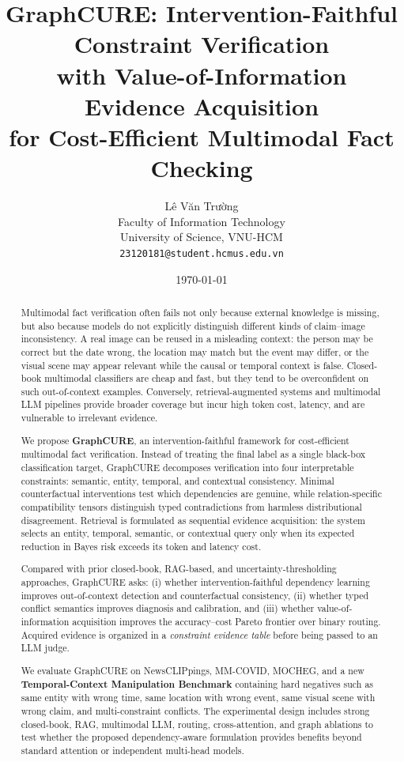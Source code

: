 \documentclass[11pt,a4paper]{article}
\title{
\textbf{GraphCURE: Intervention-Faithful Constraint Verification\\
with Value-of-Information Evidence Acquisition\\
for Cost-Efficient Multimodal Fact Checking}
}
\author{
Lê Văn Trường\\
Faculty of Information Technology\\
University of Science, VNU-HCM\\
\texttt{23120181@student.hcmus.edu.vn}
}
\date{\today}
\begin{document}
\maketitle

\begin{abstract}
Multimodal fact verification often fails not only because external knowledge is missing, but also because models do not explicitly distinguish different kinds of claim--image inconsistency. A real image can be reused in a misleading context: the person may be correct but the date wrong, the location may match but the event may differ, or the visual scene may appear relevant while the causal or temporal context is false. Closed-book multimodal classifiers are cheap and fast, but they tend to be overconfident on such out-of-context examples. Conversely, retrieval-augmented systems and multimodal LLM pipelines provide broader coverage but incur high token cost, latency, and are vulnerable to irrelevant evidence.

We propose \textbf{GraphCURE}, an intervention-faithful framework for cost-efficient multimodal fact verification. Instead of treating the final label as a single black-box classification target, GraphCURE decomposes verification into four interpretable constraints: semantic, entity, temporal, and contextual consistency. Minimal counterfactual interventions test which dependencies are genuine, while relation-specific compatibility tensors distinguish typed contradictions from harmless distributional disagreement. Retrieval is formulated as sequential evidence acquisition: the system selects an entity, temporal, semantic, or contextual query only when its expected reduction in Bayes risk exceeds its token and latency cost.

Compared with prior closed-book, RAG-based, and uncertainty-thresholding approaches, GraphCURE asks: (i) whether intervention-faithful dependency learning improves out-of-context detection and counterfactual consistency, (ii) whether typed conflict semantics improves diagnosis and calibration, and (iii) whether value-of-information acquisition improves the accuracy--cost Pareto frontier over binary routing. Acquired evidence is organized in a \textit{constraint evidence table} before being passed to an LLM judge.

We evaluate GraphCURE on NewsCLIPpings, MM-COVID, MOCHEG, and a new \textbf{Temporal-Context Manipulation Benchmark} containing hard negatives such as same entity with wrong time, same location with wrong event, same visual scene with wrong claim, and multi-constraint conflicts. The experimental design includes strong closed-book, RAG, multimodal LLM, routing, cross-attention, and graph ablations to test whether the proposed dependency-aware formulation provides benefits beyond standard attention or independent multi-head models.
\end{abstract}
\end{document}
